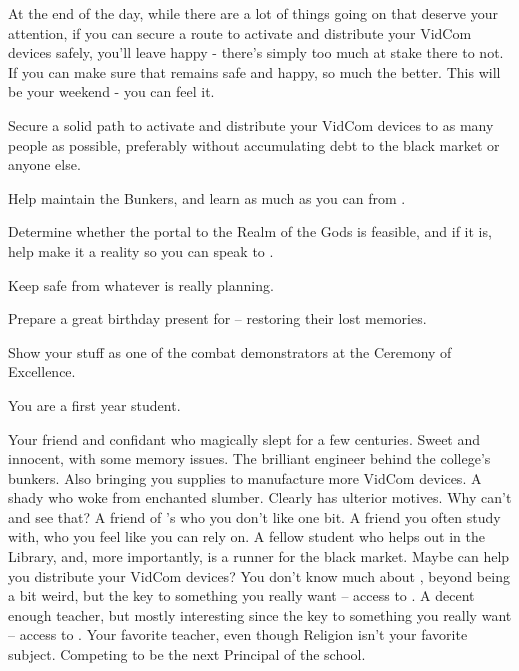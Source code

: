 \documentclass[char]{GL2020}
\begin{document}
At the end of the day, while there are a lot of things going on that deserve your attention, if you can secure a route to activate and distribute your VidCom devices safely, you'll leave happy - there's simply too much at stake there to not. If you can make sure that \cDisney{} remains safe and happy, so much the better. This will be your weekend - you can feel it.

\begin{itemz}
	\item Secure a solid path to activate and distribute your VidCom devices to as many people as possible, preferably without accumulating debt to the black market or anyone else.
	\item Help \cBunker{} maintain the Bunkers, and learn as much as you can from \cBunker{\them}.
	\item Determine whether the portal to the Realm of the Gods is feasible, and if it is, help make it a reality so you can speak to \cTechGod{}.
	\item Keep \cDisney{} safe from whatever \cWildCard{} is really planning.
	\item Prepare a great birthday present for \cDisney{} – restoring their lost memories.
	\item Show your stuff as one of the combat demonstrators at the Ceremony of Excellence.
\end{itemz}

\begin{itemz}[Notes]
	\item You are a first year student.
\end{itemz}

\begin{contacts}
	\contact{\cDisney{}} Your friend and confidant who magically slept for a few centuries. Sweet and innocent, with some memory issues.
	\contact{\cBunker{}} The brilliant engineer behind the college's bunkers. Also bringing you supplies to manufacture more VidCom devices.
	\contact{\cWildCard{}} A shady \cWildCard{\person} who woke \cDisney{} from \cDisney{\their} enchanted slumber. Clearly has ulterior motives. Why can't \cDisney{} and \cPirateChild{} see that?
	\contact{\cPirateChild{}} A friend of \cDisney{}'s who you don't like one bit.
	\contact{\cScholarship{}}A friend you often study with, who you feel like you can rely on.
	\contact{\cLibAssist{}} A fellow student who helps out in the Library, and, more importantly, is a runner for the black market. Maybe \cLibAssist{\they} can help you distribute your VidCom devices?
	\contact{\cCurse{}} You don't know much about \cCurse{\them}, beyond \cCurse{\them} being a bit weird, but \cCurse{\they} \cCurse{\have} the key to something you really want – access to \cTechGod{}.  
	\contact{\cFlowPriest{}} A decent enough teacher, but mostly interesting since \cFlowPriest{\they} \cFlowPriest{\have} the key to something you really want – access to \cTechGod{}. 
	\contact{\cBeetle{}} Your favorite teacher, even though Religion isn't your favorite subject. Competing to be the next Principal of the school.
\end{contacts}
\end{document}
